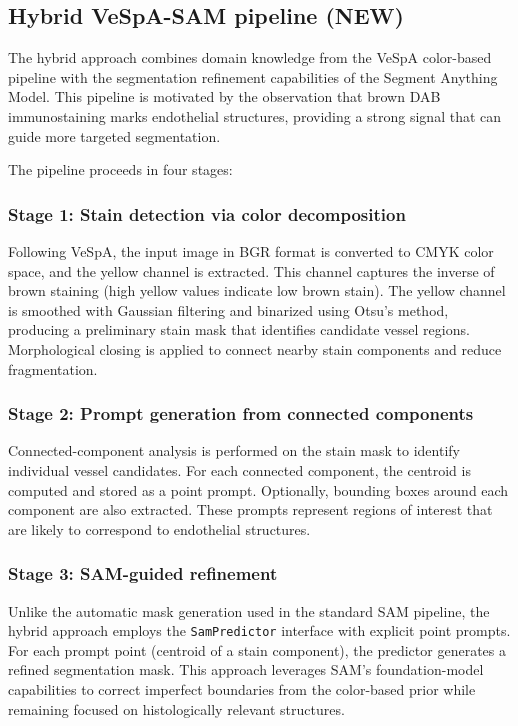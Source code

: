

\subsection{Hybrid VeSpA-SAM pipeline (NEW)}

The hybrid approach combines domain knowledge from the VeSpA color-based pipeline with the segmentation refinement capabilities of the Segment Anything Model. This pipeline is motivated by the observation that brown DAB immunostaining marks endothelial structures, providing a strong signal that can guide more targeted segmentation.

The pipeline proceeds in four stages:

\subsubsection{Stage 1: Stain detection via color decomposition}
Following VeSpA, the input image in BGR format is converted to CMYK color space, and the yellow channel is extracted. This channel captures the inverse of brown staining (high yellow values indicate low brown stain). The yellow channel is smoothed with Gaussian filtering and binarized using Otsu's method, producing a preliminary stain mask that identifies candidate vessel regions. Morphological closing is applied to connect nearby stain components and reduce fragmentation.

\subsubsection{Stage 2: Prompt generation from connected components}
Connected-component analysis is performed on the stain mask to identify individual vessel candidates. For each connected component, the centroid is computed and stored as a point prompt. Optionally, bounding boxes around each component are also extracted. These prompts represent regions of interest that are likely to correspond to endothelial structures.

\subsubsection{Stage 3: SAM-guided refinement}
Unlike the automatic mask generation used in the standard SAM pipeline, the hybrid approach employs the \texttt{SamPredictor} interface with explicit point prompts. For each prompt point (centroid of a stain component), the predictor generates a refined segmentation mask. This approach leverages SAM's foundation-model capabilities to correct imperfect boundaries from the color-based prior while remaining focused on histologically relevant structures.

